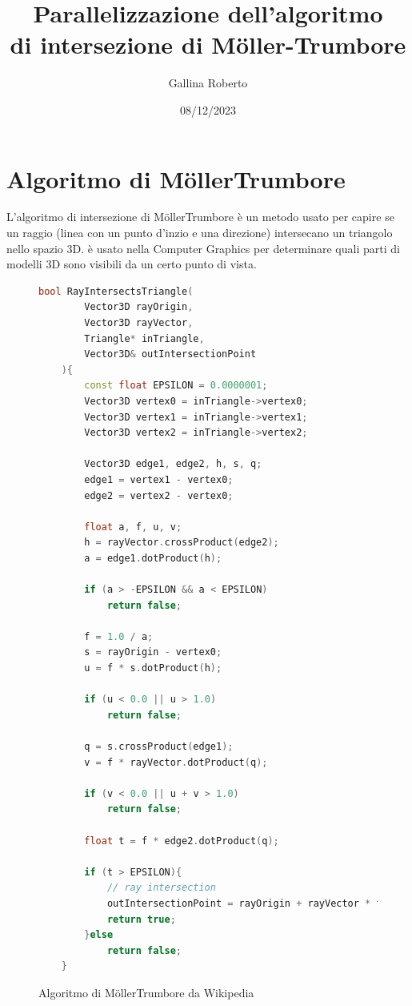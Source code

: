 \documentclass[a4paper]{article}
\begin{document}
\title{Parallelizzazione dell'algoritmo \\di intersezione di Möller-Trumbore}
\author{Gallina Roberto}
\date{08/12/2023}

\maketitle

\newpage

\tableofcontents

\newpage

\section{Algoritmo di Möller\-Trumbore}
L'algoritmo di intersezione di Möller\-Trumbore è un metodo usato per capire se un raggio (linea con un punto d'inzio e una direzione) intersecano un triangolo nello spazio 3D.
è usato nella Computer Graphics per determinare quali parti di modelli 3D sono visibili da un certo punto di vista.

\begin{figure}[htp]
    \begin{lstlisting}[language=c++]
    bool RayIntersectsTriangle(
        Vector3D rayOrigin, 
        Vector3D rayVector, 
        Triangle* inTriangle,
        Vector3D& outIntersectionPoint
    ){
        const float EPSILON = 0.0000001;
        Vector3D vertex0 = inTriangle->vertex0;
        Vector3D vertex1 = inTriangle->vertex1;  
        Vector3D vertex2 = inTriangle->vertex2;
        
        Vector3D edge1, edge2, h, s, q;
        edge1 = vertex1 - vertex0;
        edge2 = vertex2 - vertex0;
        
        float a, f, u, v;
        h = rayVector.crossProduct(edge2);
        a = edge1.dotProduct(h);
        
        if (a > -EPSILON && a < EPSILON)
            return false;
        
        f = 1.0 / a;
        s = rayOrigin - vertex0;
        u = f * s.dotProduct(h);
        
        if (u < 0.0 || u > 1.0)
            return false;
            
        q = s.crossProduct(edge1);
        v = f * rayVector.dotProduct(q);
            
        if (v < 0.0 || u + v > 1.0)
            return false;
        
        float t = f * edge2.dotProduct(q);
        
        if (t > EPSILON){
            // ray intersection
            outIntersectionPoint = rayOrigin + rayVector * t;
            return true;
        }else
            return false;
    }
    \end{lstlisting}
    \caption{Algoritmo di Möller\-Trumbore da Wikipedia}
\end{figure}
\end{document}
